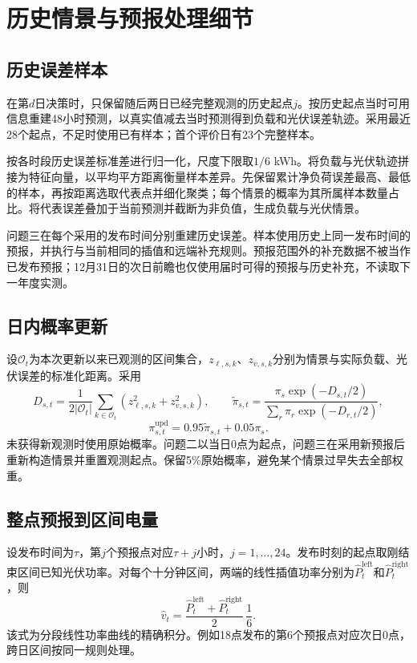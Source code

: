 \clearpage
\appendix
\section{历史情景与预报处理细节}\label{app:scenario}
\subsection{历史误差样本}
在第$d$日决策时，只保留随后两日已经完整观测的历史起点$j$。按历史起点当时可用信息重建48小时预测，以真实值减去当时预测得到负载和光伏误差轨迹。采用最近28个起点，不足时使用已有样本；首个评价日有23个完整样本。

按各时段历史误差标准差进行归一化，尺度下限取$1/6$ kWh。将负载与光伏轨迹拼接为特征向量，以平均平方距离衡量样本差异。先保留累计净负荷误差最高、最低的样本，再按距离选取代表点并细化聚类；每个情景的概率为其所属样本数量占比。将代表误差叠加于当前预测并截断为非负值，生成负载与光伏情景。

问题三在每个采用的发布时间分别重建历史误差。样本使用历史上同一发布时间的预报，并执行与当前相同的插值和远端补充规则。预报范围外的补充数据不被当作已发布预报；12月31日的次日前瞻也仅使用届时可得的预报与历史补充，不读取下一年度实测。

\subsection{日内概率更新}
设$\mathcal O_t$为本次更新以来已观测的区间集合，$z_{\ell,s,k}$、$z_{v,s,k}$分别为情景与实际负载、光伏误差的标准化距离。采用
\begin{equation}
D_{s,t}=\frac{1}{2|\mathcal O_t|}\sum_{k\in\mathcal O_t}
(z_{\ell,s,k}^2+z_{v,s,k}^2),\qquad
\widetilde\pi_{s,t}=\frac{\pi_s\exp(-D_{s,t}/2)}
{\sum_r\pi_r\exp(-D_{r,t}/2)},
\end{equation}
\begin{equation}
\pi_{s,t}^{\mathrm{upd}}=0.95\widetilde\pi_{s,t}+0.05\pi_s.
\end{equation}
未获得新观测时使用原始概率。问题二以当日0点为起点，问题三在采用新预报后重新构造情景并重置观测起点。保留5\%原始概率，避免某个情景过早失去全部权重。

\subsection{整点预报到区间电量}
设发布时间为$\tau$，第$j$个预报点对应$\tau+j$小时，$j=1,\ldots,24$。发布时刻的起点取刚结束区间已知光伏功率。对每个十分钟区间，两端的线性插值功率分别为$\widehat P_t^{\mathrm{left}}$和$\widehat P_t^{\mathrm{right}}$，则
\begin{equation}
\widehat v_t=\frac{\widehat P_t^{\mathrm{left}}+\widehat P_t^{\mathrm{right}}}{2}\,\frac16.
\end{equation}
该式为分段线性功率曲线的精确积分。例如18点发布的第6个预报点对应次日0点，跨日区间按同一规则处理。

